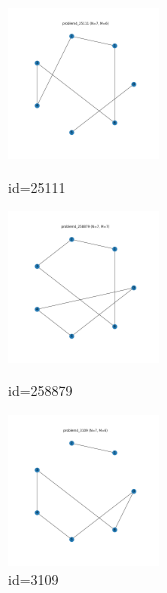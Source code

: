 \documentclass[a4paper, 10pt, dvipdfmx]{jlreq}
\begin{document}
\begin{figure}[htbp]
  \begin{minipage}{0.33\hsize}
    \begin{center}
      \includegraphics[width=40mm]{./img_5/problem4_25111.png}
    \end{center}
    \caption{id=25111}
  \end{minipage}
  \begin{minipage}{0.33\hsize}
    \begin{center}
      \includegraphics[width=40mm]{./img_5/problem4_258879.png}
    \end{center}
    \caption{id=258879}
  \end{minipage}
  \begin{minipage}{0.33\hsize}
    \begin{center}
      \includegraphics[width=40mm]{./img_5/problem4_3109.png}
    \end{center}
    \caption{id=3109}
  \end{minipage}
\end{figure}
\end{document}
